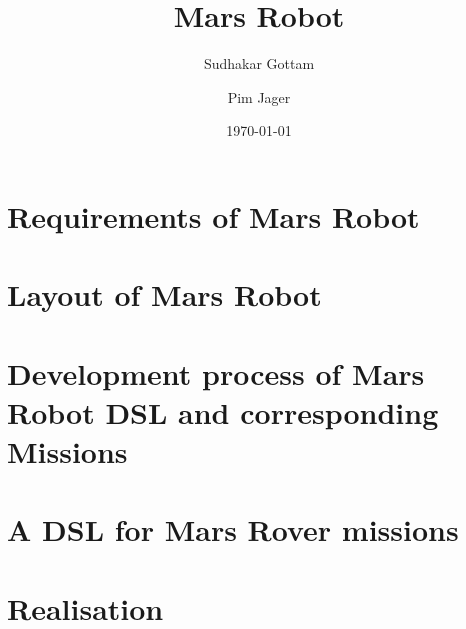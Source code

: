 \documentclass[titlepage]{article}
\author{%
	Sudhakar Gottam\and
	Pim Jager
}
\title{Mars Robot}
\date{\today}
\begin{document}
\maketitle
\tableofcontents
\newpage

\section{Requirements of Mars Robot} \label{sec:requirements}
 

\section{Layout of Mars Robot} \label{sec:layout}


\section{Development process of Mars Robot DSL and corresponding Missions}
\label{sec:process}


\section{A DSL for Mars Rover missions}


\section{Realisation}

\end{document}
